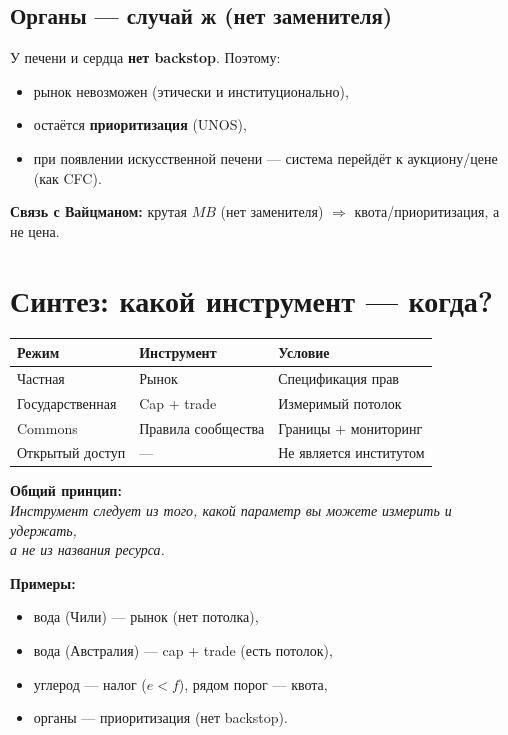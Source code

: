 \documentclass[12pt]{article}
\begin{document}
\subsection{Органы --- случай \textbf{ж} (нет заменителя)}
У печени и сердца \textbf{нет backstop}. Поэтому:
\begin{itemize}
\item рынок невозможен (этически и институционально),
\item остаётся \textbf{приоритизация} (UNOS),
\item при появлении искусственной печени --- система перейдёт к аукциону/цене (как CFC).
\end{itemize}

\textbf{Связь с Вайцманом:} крутая $MB$ (нет заменителя) $\Rightarrow$ квота/приоритизация, а не цена.

\section{Синтез: какой инструмент --- когда?}

\begin{tabular}{@{}lll@{}}
\toprule
\textbf{Режим} & \textbf{Инструмент} & \textbf{Условие} \\
\midrule
Частная & Рынок & Спецификация прав \\
Государственная & Cap + trade & Измеримый потолок \\
Commons & Правила сообщества & Границы + мониторинг \\
Открытый доступ & --- & Не является институтом \\
\bottomrule
\end{tabular}
\vspace{0.5cm}

\textbf{Общий принцип:} \\
\textit{Инструмент следует из того, какой параметр вы можете измерить и удержать, \\
а не из названия ресурса.}

\textbf{Примеры:}
\begin{itemize}
\item вода (Чили) --- рынок (нет потолка),
\item вода (Австралия) --- cap + trade (есть потолок),
\item углерод --- налог ($e < f$), рядом порог --- квота,
\item органы --- приоритизация (нет backstop).
\end{itemize}
\end{document}
